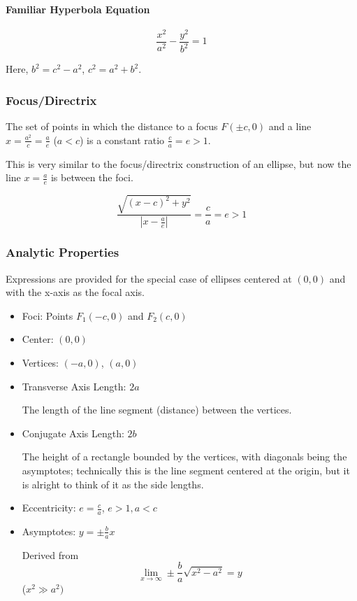 \documentclass{article}
\begin{document}
\paragraph{Familiar Hyperbola Equation}
$$\frac{x^2}{a^2} - \frac{y^2}{b^2} = 1$$

Here, $b^2 = c^2 - a^2$, $c^2 = a^2 + b^2$.

\subsubsection{Focus/Directrix}
The set of points in which the distance to a focus $F(\pm c, 0)$ and a line $x = \frac{a^2}{c} = \frac{a}{e}$ ($a < c$) is a constant ratio $\frac{c}{a} = e > 1$.

This is very similar to the focus/directrix construction of an ellipse, but now the line $x = \frac{a}{e}$ is between the foci.

$$\frac{\sqrt{(x-c)^2+y^2}}{|x-\frac{a}{e}|} = \frac{c}{a} = e > 1$$

\subsubsection{Analytic Properties}
Expressions are provided for the special case of ellipses centered at $(0, 0)$ and with the x-axis as the focal axis.

\begin{itemize}
    \item Foci: Points $F_1(-c, 0)$ and $F_2(c, 0)$
    \item Center: $(0, 0)$
    \item Vertices: $(-a, 0)$, $(a, 0)$
    \item Transverse Axis Length: $2a$
    
    The length of the line segment (distance) between the vertices.
    
    \item Conjugate Axis Length: $2b$
    
    The height of a rectangle bounded by the vertices, with diagonals being the asymptotes; technically this is the line segment centered at the origin, but it is alright to think of it as the side lengths.
    
    \item Eccentricity: $e = \frac{c}{a}$, $e > 1, a < c$
    \item Asymptotes: $y = \pm\frac{b}{a}x$

    Derived from $$\lim_{x \to \infty} \pm \frac{b}{a} \sqrt{x^2-a^2} = y$$ ($x^2 \gg a^2)$
\end{itemize}
\end{document}
